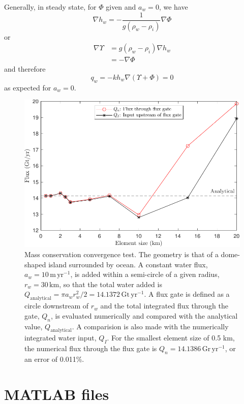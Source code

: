 \documentclass[10pt,a4paper]{article}
\begin{document}
Generally, in steady state, for $\Phi$ given and $a_w=0$, we have
\begin{equation}
\nabla h_w  = -\frac{1}{g (\rho_w-\rho_i)} \nabla \Phi 
\label{eq:hwUss2}
\end{equation}
or
\begin{align*}
  \nabla \Upsilon &= g (\rho_w-\rho_i) \nabla h_w  \\
                  &= -\nabla \Phi
\end{align*}
and therefore
\[
q_w= -k h_w \nabla (\Upsilon + \Phi) =0
\]
as expected for $a_w=0$.


\begin{figure}
\centerline{\includegraphics[width=12cm]{IslandConvergenceTest.pdf}}
\caption[Convergence test]{Mass conservation convergence test. The
  geometry is that of a dome-shaped island surrounded by ocean. A
  constant water flux, $a_w=10\,\mathrm{m\,yr^{-1}}$, is added within a semi-circle of a given
  radius, $r_w=30\,\mathrm{km}$, so that the total water added is
  $Q_{\mathrm{analytical}}=\pi a_w
  r_w^2/2=14.1372\,\mathrm{Gt\,yr^{-1}}$. A flux gate is defined as a
  circle downstream of $r_w$ and the total integrated flux through the
  gate, $Q_n$, is evaluated numerically and compared with the
  analytical value, $Q_{\mathrm{analytical}}$. A comparision is also
  made with the numerically integrated water input, $Q_I$. For the
  smallest element size of 0.5 km, the numerical flux through the flux
  gate is $Q_n=14.1386\,\mathrm{Gr\,yr^{-1}}$, or an error of 0.011\%.
\label{fig:IslandCon}}
\end{figure}



\section{MATLAB files}
\end{document}
